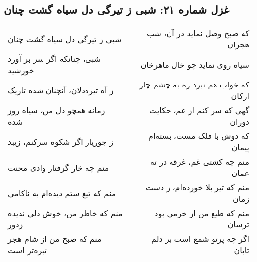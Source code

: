 \begin{center}
\section*{غزل شماره ۲۱: شبی ز تیرگی دل سیاه گشت چنان}
\label{sec:021}
\begin{longtable}{l p{0.5cm} r}
شبی ز تیرگی دل سیاه گشت چنان
&&
که صبح وصل نماید در آن، شب هجران
\\
شبی، چنانکه اگر سر بر آورد خورشید
&&
سیاه روی نماید چو خال ماهرخان
\\
ز آه تیره‌دلان، آنچنان شده تاریک
&&
که خواب هم نبرد ره به چشم چار ارکان
\\
زمانه همچو دل من، سیاه روز شده
&&
گهی که سر کنم از غم، حکایت دوران
\\
ز جوریار اگر شکوه سرکنم، زیبد
&&
که دوش با فلک مست، بسته‌ام پیمان
\\
منم چه خار گرفتار وادی محنت
&&
منم چه کشتی غم، غرقه در ته عمان
\\
منم که تیغ ستم دیده‌ام به ناکامی
&&
منم که تیر بلا خورده‌ام، ز دست زمان
\\
منم که خاطر من، خوش دلی ندیده زدور
&&
منم که طبع من از خرمی بود ترسان
\\
منم که صبح من از شام هجر تیره‌تر است
&&
اگر چه پرتو شمع است بر دلم تابان
\\
\end{longtable}
\end{center}
